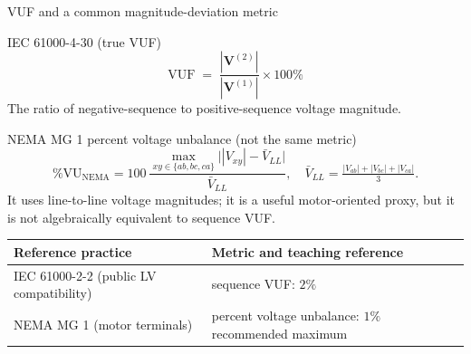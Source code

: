 \documentclass[aspectratio=169,10pt]{beamer}
\begin{document}
\begin{frame}[shrink=3]{VUF and a common magnitude-deviation metric}
\begin{block}{IEC 61000-4-30 (true VUF)}
\begin{equation*}
\text{VUF} \;=\; \frac{|\mathbf{V}^{(2)}|}{|\mathbf{V}^{(1)}|} \times 100\%
\end{equation*}
The ratio of negative-sequence to positive-sequence voltage magnitude.
\end{block}
\begin{block}{NEMA MG 1 percent voltage unbalance (not the same metric)}
\begin{equation*}
\%\mathrm{VU}_{\mathrm{NEMA}}
=100\,\frac{\max\limits_{xy\in\{ab,bc,ca\}}\bigl||V_{xy}|-\bar V_{LL}\bigr|}{\bar V_{LL}},
\quad \bar V_{LL}=\tfrac{|V_{ab}|+|V_{bc}|+|V_{ca}|}{3}.
\end{equation*}
It uses line-to-line voltage magnitudes; it is a useful motor-oriented proxy, but it is not algebraically equivalent to sequence VUF.
\end{block}
\vspace{0.3em}
\centering
\small
\begin{tabular}{ll}
\toprule
Reference practice & Metric and teaching reference \\
\midrule
IEC 61000-2-2 (public LV compatibility) & sequence VUF: $2\%$ \\
NEMA MG 1 (motor terminals) & percent voltage unbalance: $1\%$ recommended maximum \\
\bottomrule
\end{tabular}
\end{frame}
\end{document}
